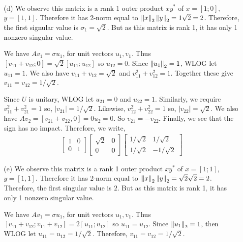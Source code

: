 \documentclass[10pt]{article}
\begin{document}
\begin{solution}[Solution]
\begin{enumerate}
\begin{align*}
        \end{align*}
    \item[(d)]We observe this matrix is a rank 1 outer product \( xy^* \) of \( x=[1;0] \), \( y=[1,1] \). Therefore it has 2-norm equal to \( \left\lVert x\right\rVert_2 \left\lVert y\right\rVert_2 = 1\sqrt{2} = 2 \). Therefore, the first signular value is \( \sigma_1 = \sqrt{2} \). But as this matrix is rank 1, it has only 1 nonzero singular value. 
        
        We have \( Av_1 = \sigma u_1 \), for unit vectors \( u_1,v_1 \). Thus \( [v_{11}+v_{12} ; 0] = \sqrt{2}[u_{11} ; u_{12}] \) so \( u_{12} = 0 \). Since \( \left\lVert u_{1}\right\rVert_2 = 1 \), WLOG let \( u_{11}=1 \). We also have \( v_{11}+v_{12}=\sqrt{2} \) and \( v_{11}^2+v_{12}^2=1 \). Together these give \( v_{11}=v_{12}=1/\sqrt{2} \).
        
        Since \( U \) is unitary, WLOG let \( u_{21}=0 \) and \( u_{22} = 1 \). Similarly, we require \( v_{11}^2+v_{21}^2 = 1 \) so, \( |v_{21}| = 1/\sqrt{2} \). Likewise, \( v_{12}^2+v_{22}^2=1 \) so, \( |v_{22}|=\sqrt{2} \). We also have \( Av_2 = [v_{21}+v_{22},0] = 0u_2 = 0 \). So \( v_{21}=-v_{22} \). Finally, we see that the sign has no impact. Therefore, we write,
        \begin{align*}
            \left[\begin{array}{cc}1 & 0\\0 & 1\end{array}\right]\left[\begin{array}{cc}\sqrt{2} & 0\\0 & 0\end{array}\right] \left[\begin{array}{cc}1/\sqrt{2} & 1/\sqrt{2}\\1/\sqrt{2} & -1/\sqrt{2}\end{array}\right]
        \end{align*}
    \item[(e)]We observe this matrix is a rank 1 outer product \( xy^* \) of \( x=[1;1] \), \( y=[1,1] \). Therefore it has 2-norm equal to \( \left\lVert x\right\rVert_2 \left\lVert y\right\rVert_2 = \sqrt{2}\sqrt{2} = 2 \). Therefore, the first singular value is \( 2 \). But as this matrix is rank 1, it has only 1 nonzero singular value.
        
        We have \( Av_1 = \sigma u_1 \), for unit vectors \( u_1,v_1 \). Thus \( [v_{11}+v_{12} ; v_{11}+v_{12}] = 2[u_{11} ; u_{12}] \) so \( u_{11} = u_{12} \). Since \( \left\lVert u_{1}\right\rVert_2 = 1 \), then WLOG let \( u_{11}=u_{12} = 1/\sqrt{2} \). Therefore, \( v_{11}=v_{12}=1/\sqrt{2} \).
        

\end{enumerate}
\end{solution}
\end{document}
